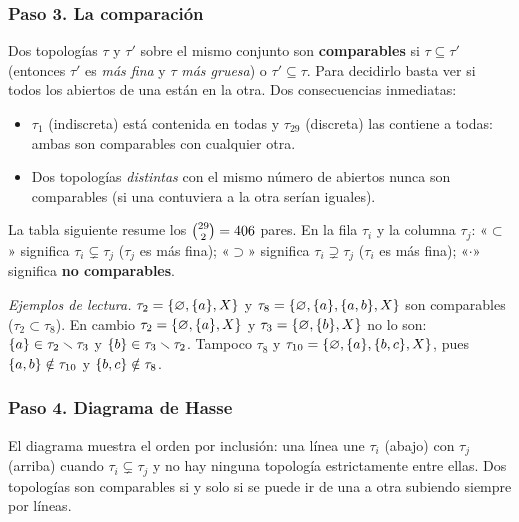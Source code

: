 \subsubsection*{Paso 3. La comparación}
Dos topologías $\tau$ y $\tau'$ sobre el mismo conjunto son \textbf{comparables} si $\tau\subseteq\tau'$ (entonces
$\tau'$ es \emph{más fina} y $\tau$ \emph{más gruesa}) o $\tau'\subseteq\tau$. Para decidirlo basta ver si todos los
abiertos de una están en la otra. Dos consecuencias inmediatas:
\begin{itemize}
\item $\tau_1$ (indiscreta) está contenida en todas y $\tau_{29}$ (discreta) las contiene a todas: ambas son
comparables con cualquier otra.
\item Dos topologías \emph{distintas} con el mismo número de abiertos nunca son comparables (si una contuviera a la
otra serían iguales).
\end{itemize}
La tabla siguiente resume los $\binom{29}{2}=406$ pares. En la fila $\tau_i$ y la columna $\tau_j$:
«$\subset$» significa $\tau_i\subsetneq\tau_j$ ($\tau_j$ es más fina); «$\supset$» significa $\tau_i\supsetneq\tau_j$
($\tau_i$ es más fina); «$\cdot$» significa \textbf{no comparables}.
\begin{center}
{\setlength{\tabcolsep}{2.9pt}\renewcommand{\arraystretch}{1.12}\footnotesize}
\end{center}

\emph{Ejemplos de lectura.} $\tau_2=\{\varnothing,\{a\},X\}$ y $\tau_8=\{\varnothing,\{a\},\{a,b\},X\}$ son comparables
($\tau_2\subset\tau_8$). En cambio $\tau_2=\{\varnothing,\{a\},X\}$ y $\tau_3=\{\varnothing,\{b\},X\}$ no lo son: $\{a\}\in\tau_2\smallsetminus\tau_3$ y
$\{b\}\in\tau_3\smallsetminus\tau_2$. Tampoco $\tau_8$ y $\tau_{10}=\{\varnothing,\{a\},\{b,c\},X\}$, pues $\{a,b\}\notin\tau_{10}$ y
$\{b,c\}\notin\tau_8$.

\subsubsection*{Paso 4. Diagrama de Hasse}
El diagrama muestra el orden por inclusión: una línea une $\tau_i$ (abajo) con $\tau_j$ (arriba) cuando
$\tau_i\subsetneq\tau_j$ y no hay ninguna topología estrictamente entre ellas. Dos topologías son comparables si y
solo si se puede ir de una a otra subiendo siempre por líneas.
\begin{center}
\resizebox{\linewidth}{!}{}
\end{center}

